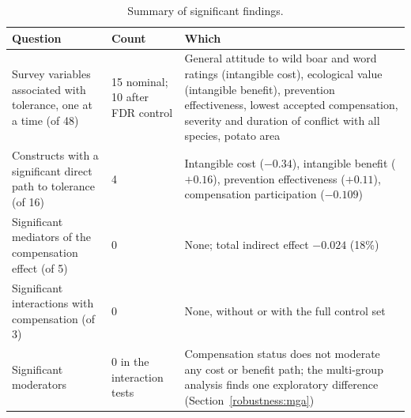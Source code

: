 \begin{table}[htbp]
\centering
\caption{Summary of significant findings.}
\label{tab:findings-count}
\begin{tabular}{p{4.6cm}p{2.2cm}p{6.2cm}}
\hline
\textbf{Question} & \textbf{Count} & \textbf{Which} \\
\hline
Survey variables associated with tolerance, one at a time (of 48) & 15 nominal; 10 after FDR control & General attitude to wild boar and word ratings (intangible cost), ecological value (intangible benefit), prevention effectiveness, lowest accepted compensation, severity and duration of conflict with all species, potato area \\
Constructs with a significant direct path to tolerance (of 16) & 4 & Intangible cost ($-0.34$), intangible benefit ($+0.16$), prevention effectiveness ($+0.11$), compensation participation ($-0.109$) \\
Significant mediators of the compensation effect (of 5) & 0 & None; total indirect effect $-0.024$ (18\%) \\
Significant interactions with compensation (of 3) & 0 & None, without or with the full control set \\
Significant moderators & 0 in the interaction tests & Compensation status does not moderate any cost or benefit path; the multi-group analysis finds one exploratory difference (Section~\ref{robustness:mga}) \\
\hline
\end{tabular}
\end{table}
